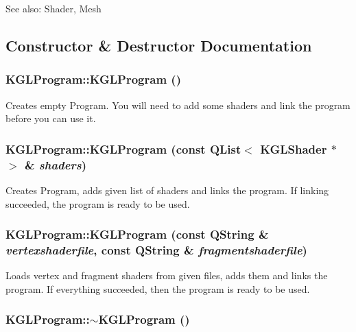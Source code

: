 \begin{Desc}
\item[See also:]Shader, Mesh \end{Desc}


\subsection{Constructor \& Destructor Documentation}
\hypertarget{class_k_g_l_program_e252511a4efad9a198d44a0a69b0f43b}{
\subsubsection[{KGLProgram}]{\setlength{\rightskip}{0pt plus 5cm}KGLProgram::KGLProgram ()}}
\label{class_k_g_l_program_e252511a4efad9a198d44a0a69b0f43b}


Creates empty Program. You will need to add some shaders and link the program before you can use it. \hypertarget{class_k_g_l_program_a72b7b0ac0efba795712e2e72e067127}{
\subsubsection[{KGLProgram}]{\setlength{\rightskip}{0pt plus 5cm}KGLProgram::KGLProgram (const QList$<$ {\bf KGLShader} $\ast$ $>$ \& {\em shaders})}}
\label{class_k_g_l_program_a72b7b0ac0efba795712e2e72e067127}


Creates Program, adds given list of shaders and links the program. If linking succeeded, the program is ready to be used. \hypertarget{class_k_g_l_program_ed56f8e432d8e523deab848515b04bea}{
\subsubsection[{KGLProgram}]{\setlength{\rightskip}{0pt plus 5cm}KGLProgram::KGLProgram (const QString \& {\em vertexshaderfile}, \/  const QString \& {\em fragmentshaderfile})}}
\label{class_k_g_l_program_ed56f8e432d8e523deab848515b04bea}


Loads vertex and fragment shaders from given files, adds them and links the program. If everything succeeded, then the program is ready to be used. \hypertarget{class_k_g_l_program_2c90a7ed95bc53b2766e556c1ca996cb}{
\subsubsection[{$\sim$KGLProgram}]{\setlength{\rightskip}{0pt plus 5cm}KGLProgram::$\sim$KGLProgram ()}}
\label{class_k_g_l_program_2c90a7ed95bc53b2766e556c1ca996cb}


